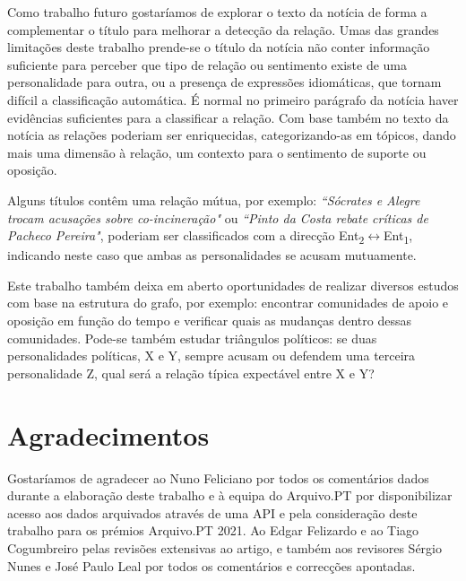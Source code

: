\documentclass[a4paper, twocolumn, 11pt, twoside]{article}
\begin{document}
Como trabalho futuro gostaríamos de explorar o texto da notícia de forma a complementar o título para melhorar a detecção da relação. Umas das grandes limitações deste trabalho prende-se o título da notícia não conter informação suficiente para perceber que tipo de relação ou sentimento existe de uma personalidade para outra, ou a presença de expressões idiomáticas, que tornam difícil a classificação automática. É normal no primeiro parágrafo da notícia haver evidências suficientes para a classificar a relação. Com base também no texto da notícia as relações poderiam ser enriquecidas, categorizando-as em tópicos, dando mais uma dimensão à relação, um contexto para o sentimento de suporte ou oposição.

Alguns títulos contêm uma relação mútua, por exemplo: \textit{``Sócrates e Alegre trocam acusações sobre co-incineração"} ou \textit{``Pinto da Costa rebate críticas de Pacheco Pereira"}, poderiam ser classificados com a direcção Ent\textsubscript{2}$\leftrightarrow$Ent\textsubscript{1}, indicando neste caso que ambas as personalidades se acusam mutuamente.

Este trabalho também deixa em aberto oportunidades de realizar diversos estudos com base na estrutura do grafo, por exemplo: encontrar comunidades de apoio e oposição em função do tempo e verificar quais as mudanças dentro dessas comunidades. Pode-se também estudar triângulos políticos: se duas personalidades políticas, X e Y, sempre acusam ou defendem uma terceira personalidade Z, qual será a relação típica expectável entre X e Y?

\section*{Agradecimentos}

Gostaríamos de agradecer ao Nuno Feliciano por todos os comentários dados durante a elaboração deste trabalho e à equipa do Arquivo.PT por disponibilizar acesso aos dados arquivados através de uma API e pela consideração deste trabalho para os prémios Arquivo.PT 2021. Ao Edgar Felizardo e ao Tiago Cogumbreiro pelas revisões extensivas ao artigo, e também aos revisores Sérgio Nunes e José Paulo Leal por todos os comentários e correcções apontadas.


\end{document}
